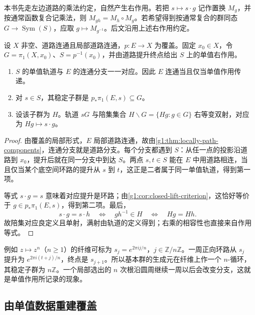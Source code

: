 本书先走左边道路的乘法约定，自然产生右作用。若把 \(s\mapsto s\cdot g\) 记作置换 \(M_g\)，并按通常函数复合记乘法，则 \(M_{gh}=M_h\circ M_g\)。若希望得到按通常复合的群同态 \(G\rightarrow\operatorname{Sym}(S)\)，应取 \(g\mapsto M_{g^{-1}}\)。后文沿用上述右作用约定。

\begin{proposition}\label{g1:prop:monodromy-components}
	设 \(X\) 非空、道路连通且局部道路连通，\(p:E\rightarrow X\) 为覆盖。固定 \(x_0\in X\)，令 \(G=\pi_1(X,x_0)\)、\(S=p^{-1}(x_0)\)，并由道路提升终点给出 \(S\) 上的单值右作用。
	\begin{enumerate}
		\item \(S\) 的单值轨道与 \(E\) 的连通分支一一对应。因此 \(E\) 连通当且仅当单值作用传递。
		\item 对 \(s\in S\)，其稳定子群是 \(p_*\pi_1(E,s)\subseteq G\)。
		\item 设该子群为 \(H\)。轨道 \(sG\) 与陪集集合 \(H\backslash G=\{Hg:g\in G\}\) 右等变双射，对应为 \(Hg\mapsto s\cdot g\)。
	\end{enumerate}
\end{proposition}
\begin{proof}
	由覆盖的局部形式，\(E\) 局部道路连通，故由\cref{g1:thm:locally-path-components}，连通分支就是道路分支。每个分支都遇到 \(S\)：从任一点的投影沿道路到 \(x_0\)，提升后就在同一分支中到达 \(S\)。两点 \(s,t\in S\) 能在 \(E\) 中用道路相连，当且仅当某个底空间环路的提升从 \(s\) 到 \(t\)，这正是二者属于同一单值轨道，得到第一项。

	等式 \(s\cdot g=s\) 意味着对应提升是环路；由\cref{g1:cor:closed-lift-criterion}，这恰好等价于 \(g\in p_*\pi_1(E,s)\)，得到第二项。最后，
	\[
		s\cdot g=s\cdot h
		\quad\Longleftrightarrow\quad gh^{-1}\in H
		\quad\Longleftrightarrow\quad Hg=Hh.
	\]
	故陪集对应良定义且单射，满射由轨道的定义得到；右乘的相容性也直接来自作用等式。
\end{proof}

例如 \(z\mapsto z^n\)（\(n\ge1\)）的纤维可标为 \(s_j=e^{2\pi ij/n}\)，\(j\in\mathbb Z/n\mathbb Z\)。一周正向环路从 \(s_j\) 提升为 \(e^{2\pi i(t+j)/n}\)，终点是 \(s_{j+1}\)。所以基本群的生成元在纤维上作一个 \(n\)-循环，其稳定子群为 \(n\mathbb Z\)。一个局部选出的 \(n\) 次根沿圆周继续一周以后会改变分支，这就是单值作用所记录的现象。

\subsection{由单值数据重建覆盖}
\label{g1:subsec:0505:03}


